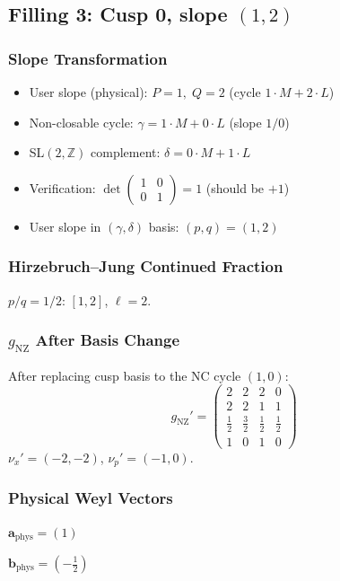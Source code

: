 \documentclass[11pt,a4paper]{article}
\begin{document}
\subsection{Filling 3: Cusp 0, slope $(1, 2)$}

\subsubsection{Slope Transformation}
\begin{itemize}
  \item User slope (physical): $P = 1,\; Q = 2$ (cycle $1 \cdot M + 2 \cdot L$)
  \item Non-closable cycle: $\gamma = 1 \cdot M + 0 \cdot L$ (slope $1/0$)
  \item SL$(2,\mathbb{Z})$ complement: $\delta = 0 \cdot M + 1 \cdot L$
  \item Verification: $\det \begin{pmatrix} 1 & 0 \\ 0 & 1 \end{pmatrix} = 1$ (should be $+1$)
  \item User slope in $(\gamma, \delta)$ basis: $(p, q) = (1, 2)$
\end{itemize}

\subsubsection{Hirzebruch--Jung Continued Fraction}
$p/q = 1/2$: $[1, 2]$, $\ell = 2$.

\subsubsection{$g_{\text{NZ}}$ After Basis Change}
After replacing cusp basis to the NC cycle $(1, 0)$:
{\small
\[
g_{\text{NZ}}' = \begin{pmatrix}
2 & 2 & 2 & 0 \\
2 & 2 & 1 & 1 \\
\tfrac{1}{2} & \tfrac{3}{2} & \tfrac{1}{2} & \tfrac{1}{2} \\
1 & 0 & 1 & 0
\end{pmatrix}
\]
}
$\nu_x' = (-2, -2)$, $\nu_p' = (-1, 0)$.

\subsubsection{Physical Weyl Vectors}
$\mathbf{a}_{\text{phys}} = (1)$

$\mathbf{b}_{\text{phys}} = (-\tfrac{1}{2})$
\end{document}
